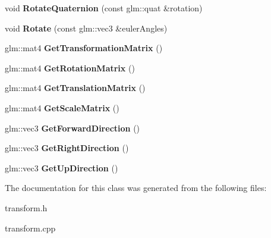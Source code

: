 \begin{DoxyCompactItemize}
\item 
\mbox{\label{classNewtonic_1_1Transform_af2f3c6257ac47f3b316a5a3e789c7ac2}} 
void {\bfseries Rotate\+Quaternion} (const glm\+::quat \&rotation)
\item 
\mbox{\label{classNewtonic_1_1Transform_abca0e870cb76a45e8f6b2ae2757a23e5}} 
void {\bfseries Rotate} (const glm\+::vec3 \&euler\+Angles)
\item 
\mbox{\label{classNewtonic_1_1Transform_ae928c5c384b27d51786b9db7836108ce}} 
glm\+::mat4 {\bfseries Get\+Transformation\+Matrix} ()
\item 
\mbox{\label{classNewtonic_1_1Transform_aad9862a47d195526fef56a685bac3e95}} 
glm\+::mat4 {\bfseries Get\+Rotation\+Matrix} ()
\item 
\mbox{\label{classNewtonic_1_1Transform_a7f26a3ed95bf742851cd386f55735fb8}} 
glm\+::mat4 {\bfseries Get\+Translation\+Matrix} ()
\item 
\mbox{\label{classNewtonic_1_1Transform_ad31b5dc088d96163507b4fc2354d601e}} 
glm\+::mat4 {\bfseries Get\+Scale\+Matrix} ()
\item 
\mbox{\label{classNewtonic_1_1Transform_a8972f877b36c5d5f0a293e9ea5af57fb}} 
glm\+::vec3 {\bfseries Get\+Forward\+Direction} ()
\item 
\mbox{\label{classNewtonic_1_1Transform_a05c3e220745d2c5bed57f69c722bfe15}} 
glm\+::vec3 {\bfseries Get\+Right\+Direction} ()
\item 
\mbox{\label{classNewtonic_1_1Transform_a1a11f37cc7084bca63db3136c646ecee}} 
glm\+::vec3 {\bfseries Get\+Up\+Direction} ()
\end{DoxyCompactItemize}


The documentation for this class was generated from the following files\+:\begin{DoxyCompactItemize}
\item 
transform.\+h\item 
transform.\+cpp\end{DoxyCompactItemize}
